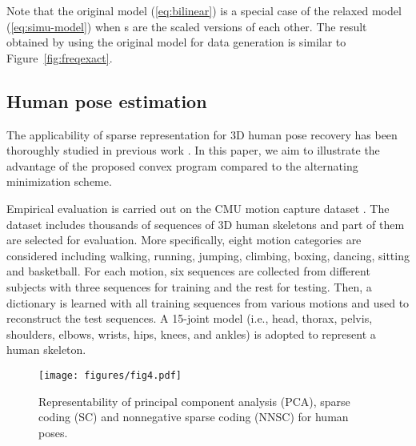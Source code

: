 \documentclass[10pt,journal,cspaper,compsoc]{IEEEtran}
\newcommand{\refEq}[1]{(\ref{#1})}
\newcommand{\refFig}[1]{Figure~\ref{#1}}
\begin{document}
Note that the original model \refEq{eq:bilinear} is a special case of the relaxed model \refEq{eq:simu-model} when s are the scaled versions of each other. The result obtained by using the original model for data generation is similar to \refFig{fig:freqexact}.

\subsection{Human pose estimation}\label{sec:human}

The applicability of sparse representation for 3D human pose recovery has been thoroughly studied in previous work \cite{ramakrishna2012reconstructing,wang2014robust,fan2014pose}. In this paper, we aim to illustrate the advantage of the proposed convex program compared to the alternating minimization scheme.

Empirical evaluation is carried out on the CMU motion capture dataset \cite{mocap}. The dataset includes thousands of sequences of 3D human skeletons and part of them are selected for evaluation. More specifically, eight motion categories are considered including walking, running, jumping, climbing, boxing, dancing, sitting and basketball. For each motion, six sequences are collected from different subjects with three sequences for training and the rest for testing. Then, a dictionary is learned with all training sequences from various motions and used to reconstruct the test sequences. A 15-joint model (i.e., head, thorax, pelvis, shoulders, elbows, wrists, hips, knees, and ankles) is adopted to represent a human skeleton.

\begin{figure}
\centering
\texttt{[image: figures/fig4.pdf]}
\caption{{Representability of principal component analysis (PCA), sparse coding (SC) and nonnegative sparse coding (NNSC) for human poses.}} \label{fig:test-dl}
\end{figure}
\end{document}
